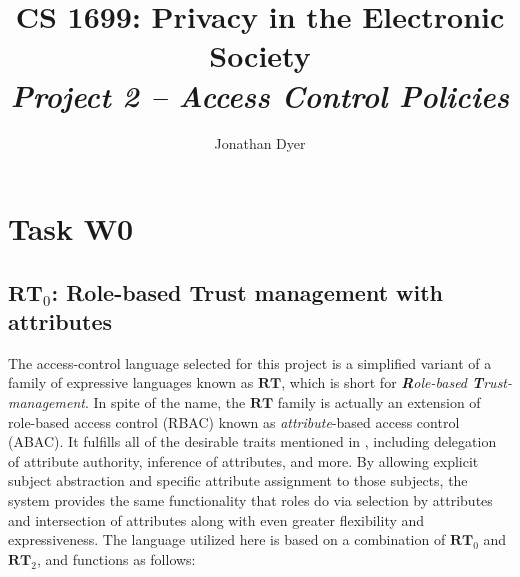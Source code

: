 \documentclass{article}
\author{Jonathan Dyer}
\title{CS 1699: Privacy in the Electronic Society \\
        \textit{Project 2 -- Access Control Policies}}
\providecommand{\task}[1]{\section{Task #1}}
\providecommand{\RT}{\textbf{RT}}
\begin{document}
\maketitle

\bigskip

\tableofcontents

\bigskip

\task{W0}
\subsection{$\RT_0$: Role-based Trust management with attributes}
The access-control language selected for this project is a simplified variant of a family of expressive languages known as $\RT$, which is short for \textit{\textbf{R}ole-based \textbf{T}rust-management}.
In spite of the name, the $\RT$ family is actually an extension of role-based access control (RBAC) known as \textit{attribute}-based access control (ABAC).
It fulfills all of the desirable traits mentioned in \cite{RTmain}, including delegation of attribute authority, inference of attributes, and more.
By allowing explicit subject abstraction and specific attribute assignment to those subjects, the system provides the same functionality that roles do via selection by attributes and intersection of attributes along with even greater flexibility and expressiveness.
The language utilized here is based on a combination of $\RT_0$ and $\RT_2$, and functions as follows: \\
\end{document}
